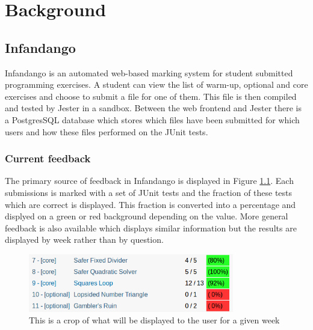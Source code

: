 \chapter{Background}
\label{background}
\section{Infandango}
Infandango is an automated web-based marking system for student submitted programming exercises. A student can view the list of warm-up, optional and core exercises and choose to submit a file for one of them. This file is then compiled and tested by Jester in a sandbox. Between the web frontend and Jester there is a PostgresSQL database which stores which files have been submitted for which users and how these files performed on the JUnit tests.
\subsection{Current feedback}
The primary source of feedback in Infandango is displayed in Figure \ref{fig:currentfeedback}. Each submissions is marked with a set of JUnit tests and the fraction of these tests which are correct is displayed. This fraction is converted into a percentage and displyed on a green or red background depending on the value. %
More general feedback is also available which displays similar information but the results are displayed by week rather than by question. 

\begin{figure}[p]
\centering
\includegraphics[width=0.8\textwidth]{currentfeedback.png}
\caption{This is a crop of what will be displayed to the user for a given week}
\label{fig:currentfeedback}
\end{figure}

